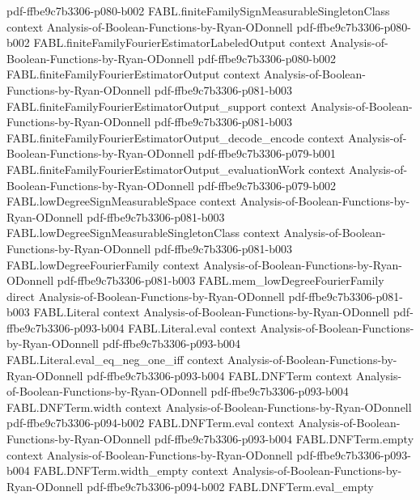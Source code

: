 \begin{theorem}
  {pdf-ffbe9c7b3306-p080-b002}
\proofstep
  {FABL.finiteFamilySignMeasurableSingletonClass}
  {context}
  {Analysis-of-Boolean-Functions-by-Ryan-ODonnell}
  {pdf-ffbe9c7b3306-p080-b002}
\proofstep
  {FABL.finiteFamilyFourierEstimatorLabeledOutput}
  {context}
  {Analysis-of-Boolean-Functions-by-Ryan-ODonnell}
  {pdf-ffbe9c7b3306-p080-b002}
\proofstep
  {FABL.finiteFamilyFourierEstimatorOutput}
  {context}
  {Analysis-of-Boolean-Functions-by-Ryan-ODonnell}
  {pdf-ffbe9c7b3306-p081-b003}
\proofstep
  {FABL.finiteFamilyFourierEstimatorOutput_support}
  {context}
  {Analysis-of-Boolean-Functions-by-Ryan-ODonnell}
  {pdf-ffbe9c7b3306-p081-b003}
\proofstep
  {FABL.finiteFamilyFourierEstimatorOutput_decode_encode}
  {context}
  {Analysis-of-Boolean-Functions-by-Ryan-ODonnell}
  {pdf-ffbe9c7b3306-p079-b001}
\proofstep
  {FABL.finiteFamilyFourierEstimatorOutput_evaluationWork}
  {context}
  {Analysis-of-Boolean-Functions-by-Ryan-ODonnell}
  {pdf-ffbe9c7b3306-p079-b002}
\proofstep
  {FABL.lowDegreeSignMeasurableSpace}
  {context}
  {Analysis-of-Boolean-Functions-by-Ryan-ODonnell}
  {pdf-ffbe9c7b3306-p081-b003}
\proofstep
  {FABL.lowDegreeSignMeasurableSingletonClass}
  {context}
  {Analysis-of-Boolean-Functions-by-Ryan-ODonnell}
  {pdf-ffbe9c7b3306-p081-b003}
\proofstep
  {FABL.lowDegreeFourierFamily}
  {context}
  {Analysis-of-Boolean-Functions-by-Ryan-ODonnell}
  {pdf-ffbe9c7b3306-p081-b003}
\proofstep
  {FABL.mem_lowDegreeFourierFamily}
  {direct}
  {Analysis-of-Boolean-Functions-by-Ryan-ODonnell}
  {pdf-ffbe9c7b3306-p081-b003}
\proofstep
  {FABL.Literal}
  {context}
  {Analysis-of-Boolean-Functions-by-Ryan-ODonnell}
  {pdf-ffbe9c7b3306-p093-b004}
\proofstep
  {FABL.Literal.eval}
  {context}
  {Analysis-of-Boolean-Functions-by-Ryan-ODonnell}
  {pdf-ffbe9c7b3306-p093-b004}
\proofstep
  {FABL.Literal.eval_eq_neg_one_iff}
  {context}
  {Analysis-of-Boolean-Functions-by-Ryan-ODonnell}
  {pdf-ffbe9c7b3306-p093-b004}
\proofstep
  {FABL.DNFTerm}
  {context}
  {Analysis-of-Boolean-Functions-by-Ryan-ODonnell}
  {pdf-ffbe9c7b3306-p093-b004}
\proofstep
  {FABL.DNFTerm.width}
  {context}
  {Analysis-of-Boolean-Functions-by-Ryan-ODonnell}
  {pdf-ffbe9c7b3306-p094-b002}
\proofstep
  {FABL.DNFTerm.eval}
  {context}
  {Analysis-of-Boolean-Functions-by-Ryan-ODonnell}
  {pdf-ffbe9c7b3306-p093-b004}
\proofstep
  {FABL.DNFTerm.empty}
  {context}
  {Analysis-of-Boolean-Functions-by-Ryan-ODonnell}
  {pdf-ffbe9c7b3306-p093-b004}
\proofstep
  {FABL.DNFTerm.width_empty}
  {context}
  {Analysis-of-Boolean-Functions-by-Ryan-ODonnell}
  {pdf-ffbe9c7b3306-p094-b002}
\proofstep
  {FABL.DNFTerm.eval_empty}

\end{theorem}
